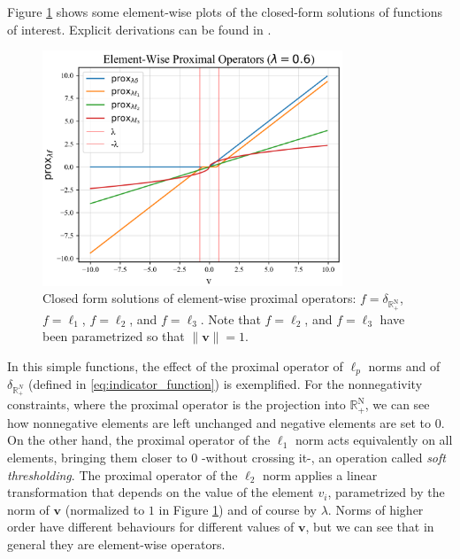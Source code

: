 Figure \ref{fig:prox_closed_form_sols} shows some element-wise plots of the closed-form solutions of functions of interest. Explicit derivations can be found in \cite{combettes_proximal_2007}. 
\begin{figure}[H]
  \begin{center}
  \includegraphics[width = 0.8\textwidth]{images/closed_form_sol_prox.PNG}
  \caption{Closed form solutions of element-wise proximal operators: $f = \delta_{\mathbb{R}_+^\mathrm{N}}$, $f = \ell_1$, $f = \ell_2$, and $f = \ell_3$. Note that $f = \ell_2$, and $f = \ell_3$ have been parametrized so that $\|\mathbf{v}\| = 1$.}
  \label{fig:prox_closed_form_sols}
  \end{center}
\end{figure}
In this simple functions, the effect of the proximal operator of $\ell_p$ norms and of $\delta_{\mathbb{R}_+^N}$ (defined in \eqref{eq:indicator_function}) is exemplified. For the nonnegativity constraints, where the proximal operator is the projection into $\mathbb{R}_+^\mathrm{N}$, we can see how nonnegative elements are left unchanged and negative elements are set to $0$. On the other hand, the proximal operator of the $\ell_1$ norm acts equivalently on all elements, bringing them closer to $0$ -without crossing it-, an operation called \textit{soft thresholding}. The proximal operator of the $\ell_2$ norm applies a linear transformation that depends on the value of the element $v_i$, parametrized by the norm of $\mathbf{v}$ (normalized to $1$ in Figure \ref{fig:prox_closed_form_sols}) and of course by $\lambda$. Norms of higher order have different behaviours for different values of $\mathbf{v}$, but we can see that in general they are element-wise operators.
 

